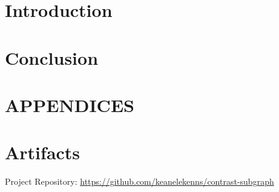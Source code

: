 \documentclass[sigconf]{acmart}
\begin{document}
\section{Introduction} \label{intro}

\cite{lanciano2020}
\cite{goldberg1984}

\section{Conclusion} \label{conclusion}





\appendix
\section*{APPENDICES}
\section{Artifacts} \label{artifacts}

Project Repository:
\url{https://github.com/keanelekenns/contrast-subgraph}
\end{document}
